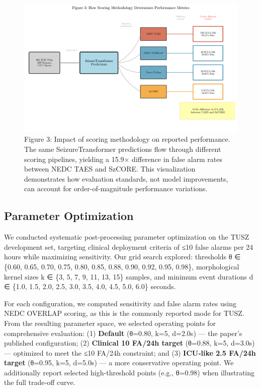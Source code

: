 \documentclass[
  10pt,
]{article}
\begin{document}
\begin{figure}
\hypertarget{fig:scoring-impact}{%
\centering
\includegraphics[width=1\textwidth,height=\textheight]{figures/fig3_scoring_impact_optimized.png}
\caption{Figure 3: Impact of scoring methodology on reported
performance. The same SeizureTransformer predictions flow through
different scoring pipelines, yielding a 15.9× difference in false alarm
rates between NEDC TAES and SzCORE. This visualization demonstrates how
evaluation standards, not model improvements, can account for
order-of-magnitude performance variations.}\label{fig:scoring-impact}
}
\end{figure}

\hypertarget{parameter-optimization}{%
\subsection{Parameter Optimization}\label{parameter-optimization}}

We conducted systematic post‑processing parameter optimization on the
TUSZ development set, targeting clinical deployment criteria of ≤10
false alarms per 24 hours while maximizing sensitivity. Our grid search
explored: thresholds θ ∈ \{0.60, 0.65, 0.70, 0.75, 0.80, 0.85, 0.88,
0.90, 0.92, 0.95, 0.98\}, morphological kernel sizes k ∈ \{3, 5, 7, 9,
11, 13, 15\} samples, and minimum event durations d ∈ \{1.0, 1.5, 2.0,
2.5, 3.0, 3.5, 4.0, 4.5, 5.0, 6.0\} seconds.

For each configuration, we computed sensitivity and false alarm rates
using NEDC OVERLAP scoring, as this is the commonly reported mode for
TUSZ. From the resulting parameter space, we selected operating points
for comprehensive evaluation: (1) \textbf{Default} (θ=0.80, k=5, d=2.0s)
--- the paper's published configuration; (2) \textbf{Clinical 10 FA/24h
target} (θ=0.88, k=5, d=3.0s) --- optimized to meet the ≤10 FA/24h
constraint; and (3) \textbf{ICU‑like 2.5 FA/24h target} (θ=0.95, k=5,
d=5.0s) --- a more conservative operating point. We additionally report
selected high‑threshold points (e.g., θ=0.98) when illustrating the full
trade‑off curve.
\end{document}
